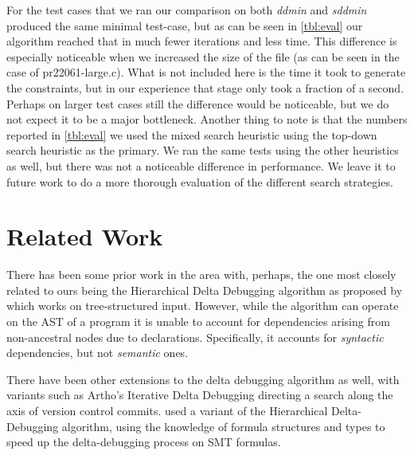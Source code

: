 \documentclass[preprint]{acm_proc_article-sp}
\begin{document}

For the test cases that we ran our comparison on both \emph{ddmin} and
\emph{sddmin} produced the same minimal test-case, but as can be seen in
\autoref{tbl:eval} our algorithm reached that in much fewer iterations and less
time. This difference is especially noticeable when we increased the size of the
file (as can be seen in the case of pr22061-large.c). What is not included here
is the time it took to generate the constraints, but in our experience that
stage only took a fraction of a second. Perhaps on larger test cases still the
difference would be noticeable, but we do not expect it to be a major
bottleneck. Another thing to note is that the numbers reported in
\autoref{tbl:eval} we used the mixed search heuristic using the top-down search
heuristic as the primary. We ran the same tests using the other heuristics as
well, but there was not a noticeable difference in performance. We leave it to
future work to do a more thorough evaluation of the different search
strategies.

\section{Related Work}



There has been some prior work in the area with, perhaps, the one most closely
related to ours being the Hierarchical Delta Debugging algorithm as proposed by
\citet{hdd} which works on tree-structured input. However, while
the algorithm can operate on the AST of a program it is unable to account for
dependencies arising from non-ancestral nodes due to declarations. Specifically,
it accounts for \emph{syntactic} dependencies, but not \emph{semantic} ones.

There have been other extensions to the delta debugging algorithm as well, with
variants such as Artho's Iterative Delta Debugging \citep{idd} directing a search
along the axis of version control commits. \citet{smt} used a
variant of the Hierarchical Delta-Debugging algorithm, using the knowledge of
formula structures and types to speed up the delta-debugging process on SMT
formulas.
\end{document}

